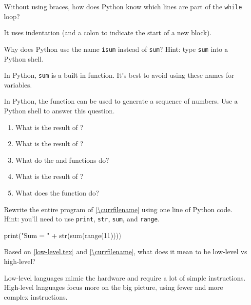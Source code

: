 \Q Without using braces, how does Python know which lines are part of the \verb|while| loop?

\begin{answer}
It uses indentation (and a colon to indicate the start of a new block).
\end{answer}


\Q Why does Python use the name \verb|isum| instead of \verb|sum|?
Hint: type \verb|sum| into a Python shell.

\begin{answer}
In Python, {\tt sum} is a built-in function.
It's best to avoid using these names for variables.
\end{answer}


\Q In Python, the  function can be used to generate a sequence of numbers.
Use a Python shell to answer this question.

\begin{enumerate}
\item What is the result of ?  \ans{\tt [0, 1, 2, 3, 4]}
\item What is the result of ? ~ 
\item What do the  and  functions do?  
\item What is the result of ? ~ 
\item What does the  function do? 
\end{enumerate}


\Q Rewrite the entire program of \ref{\currfilename} using one line of Python code.
Hint: you'll need to use \verb|print|, \verb|str|, \verb|sum|, and \verb|range|.

\begin{answer}
\begin{pythans}
print("Sum = " + str(sum(range(11))))
\end{pythans}
\end{answer}


\Q Based on \ref{low-level.tex} and \ref{\currfilename}, what does it mean to be low-level vs high-level?

\begin{answer}
Low-level languages mimic the hardware and require a lot of simple instructions.
High-level languages focus more on the big picture, using fewer and more complex instructions.
\end{answer}
